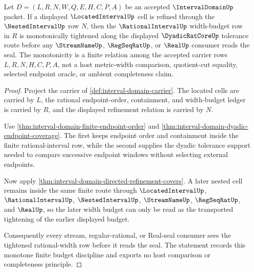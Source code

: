 \begin{theorem}
\label{thm:intervaldomain-rational-width-monotonicity}
Let $D=(L,R,N,W,Q,E,H,C,P,A)$ be an accepted $\IntervalDomainUp$ packet. If a displayed $\LocatedIntervalUp$ cell is refined through the $\NestedIntervalUp$ row $N$, then the $\RationalIntervalUp$ width-budget row in $R$ is monotonically tightened along the displayed $\DyadicRatCoreUp$ tolerance route before any $\StreamNameUp$, $\RegSeqRatUp$, or $\RealUp$ consumer reads the seal. The monotonicity is a finite relation among the accepted carrier rows $L,R,N,H,C,P,A$, not a host metric-width comparison, quotient-cut equality, selected endpoint oracle, or ambient completeness claim.
\end{theorem}
\begin{proof}
Project the carrier of \autoref{def:interval-domain-carrier}. The located cells are carried by $L$, the rational endpoint-order, containment, and width-budget ledger is carried by $R$, and the displayed refinement relation is carried by $N$.

Use \autoref{thm:interval-domain-finite-endpoint-order} and \autoref{thm:interval-domain-dyadic-endpoint-coverage}. The first keeps endpoint order and containment inside the finite rational-interval row, while the second supplies the dyadic tolerance support needed to compare successive endpoint windows without selecting external endpoints.

Now apply \autoref{thm:interval-domain-directed-refinement-covers}. A later nested cell remains inside the same finite route through $\LocatedIntervalUp$, $\RationalIntervalUp$, $\NestedIntervalUp$, $\StreamNameUp$, $\RegSeqRatUp$, and $\RealUp$, so the later width budget can only be read as the transported tightening of the earlier displayed budget.

Consequently every stream, regular-rational, or Real-seal consumer sees the tightened rational-width row before it reads the seal. The statement records this monotone finite budget discipline and exports no host comparison or completeness principle.
\end{proof}

